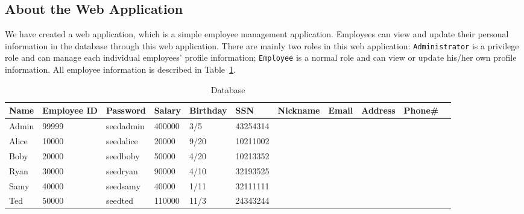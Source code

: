






\subsection{About the Web Application} 

We have created a web application, which is a simple employee 
management application. 
Employees can view and update their personal information 
in the database through this web application. 
There are mainly two roles in this web application: 
{\tt Administrator} is a privilege role and can manage each individual
employees' profile information;
{\tt Employee} is a normal role and can view or update his/her own profile 
information. All employee information is described in Table~\ref{table:database}.


\begin{table}[htb]
\caption{Database}
\label{table:database}
\centering
\begin{adjustbox}{max width=\textwidth}
\begin{tabular}{|l|l|l|l|l|l|l|l|l|l|l|}
\hline
Name & Employee ID  & Password  &Salary  &Birthday  &SSN &Nickname &Email &Address &Phone\# \\
\hline
Admin 	& 99999       & seedadmin  &400000  &3/5   &43254314	& & & &\\
Alice 	& 10000       & seedalice  &20000   &9/20  &10211002	& & & &\\
Boby 	& 20000       & seedboby   &50000   &4/20  &10213352	& & & &\\
Ryan    & 30000       & seedryan   &90000   &4/10  &32193525	& & & &\\
Samy 	& 40000	      & seedsamy   &40000   &1/11  &32111111 	& & & &\\
Ted     & 50000	      & seedted    &110000  &11/3  &24343244	& & & &\\
\hline
\end{tabular}
\end{adjustbox}
\end{table}
 



